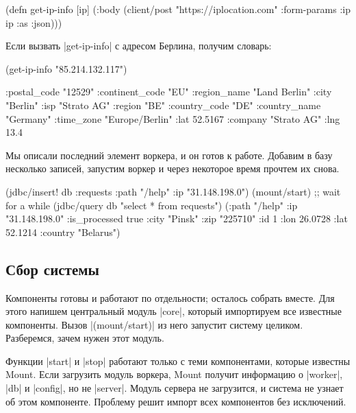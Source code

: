 \begin{english}
  \begin{clojure}
(defn get-ip-info [ip]
  (:body (client/post "https://iplocation.com"
                      {:form-params {:ip ip}
                       :as :json})))
  \end{clojure}
\end{english}

Если вызвать \spverb|get-ip-info| с адресом Берлина, получим словарь:

\begin{english}
  \begin{clojure}
(get-ip-info "85.214.132.117")

{:postal_code "12529"
 :continent_code "EU"
 :region_name "Land Berlin"
 :city "Berlin"
 :isp "Strato AG"
 :region "BE"
 :country_code "DE"
 :country_name "Germany"
 :time_zone "Europe/Berlin"
 :lat 52.5167
 :company "Strato AG"
 :lng 13.4}
  \end{clojure}
\end{english}

Мы описали последний элемент воркера, и он готов к работе. Добавим в базу
несколько записей, запустим воркер и через некоторое время прочтем их снова.

\begin{english}
  \begin{clojure}
(jdbc/insert! db :requests {:path "/help" :ip "31.148.198.0"})
(mount/start)
;; wait for a while
(jdbc/query db "select * from requests")
({:path "/help" :ip "31.148.198.0" :is_processed true
  :city "Pinsk" :zip "225710" :id 1
  :lon 26.0728 :lat 52.1214 :country "Belarus"})
  \end{clojure}
\end{english}

\subsection{Сбор системы}

Компоненты готовы и работают по отдельности; осталось собрать вместе. Для этого
напишем центральный модуль \spverb|core|, который импортируем все известные
компоненты. Вызов \spverb|(mount/start)| из него запустит систему
целиком. Разберемся, зачем нужен этот модуль.

Функции \spverb|start| и \spverb|stop| работают только с теми компонентами,
которые известны Mount. Если загрузить модуль воркера, Mount получит информацию
о \spverb|worker|, \spverb|db| и \spverb|config|, но не \spverb|server|. Модуль
сервера не загрузится, и система не узнает об этом компоненте. Проблему решит
импорт всех компонентов без исключений.

